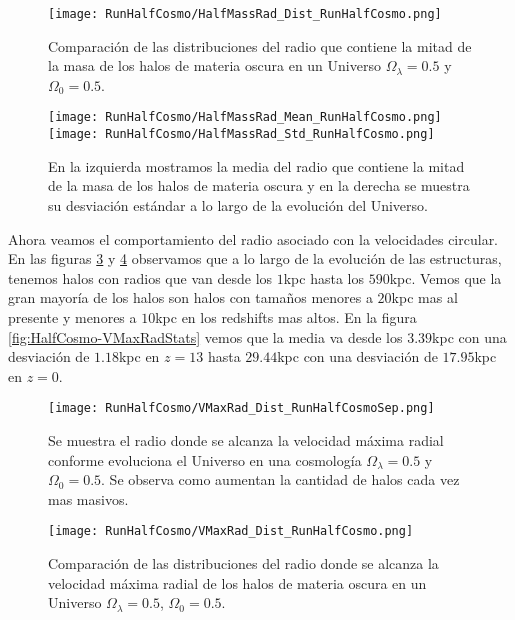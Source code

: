 \begin{figure}[H]
    \centering
    \texttt{[image: RunHalfCosmo/HalfMassRad\_Dist\_RunHalfCosmo.png]}
    \caption[Distribución del Radio que contiene la mitad de la masa]{\footnotesize Comparación de las distribuciones del radio que contiene la mitad de la masa de los halos de materia oscura en un Universo $\Omega_\lambda = 0.5 $ y $\Omega_0 = 0.5$.}
    \label{fig:HalfCosmo-HalfMassRadDist}
\end{figure}

\begin{figure}[H]
    \centering
    \texttt{[image: RunHalfCosmo/HalfMassRad\_Mean\_RunHalfCosmo.png]}
    \texttt{[image: RunHalfCosmo/HalfMassRad\_Std\_RunHalfCosmo.png]}
    \caption[Media y desviación estándar del radio de la mitad de la masa]{\footnotesize En la izquierda mostramos la media del radio que contiene la mitad de la masa de los halos de materia oscura y en la derecha se muestra su desviación estándar a lo largo de la evolución del Universo.}
    \label{fig:HalfCosmo-HalfMassRadStats}
\end{figure}

Ahora veamos el comportamiento del radio asociado con la velocidades circular. En las figuras \ref{fig:HalfCosmo-VMaxRadDistSep} y \ref{fig:HalfCosmo-VMaxRadDist} observamos que a lo largo de la evolución de las estructuras, tenemos halos con radios que van desde los $1$kpc hasta los $590$kpc. Vemos que la gran mayoría de los halos son halos con tamaños menores a $20$kpc mas al presente y menores a $10$kpc en los redshifts mas altos. En la figura \ref{fig:HalfCosmo-VMaxRadStats} vemos que la media va desde los $3.39$kpc con una desviación de $1.18$kpc en $z=13$ hasta $29.44$kpc con una desviación de $17.95$kpc en $z=0$.

\begin{figure}[H]
    \centering
    \texttt{[image: RunHalfCosmo/VMaxRad\_Dist\_RunHalfCosmoSep.png]}
    \caption[Radio donde se alcanza la velocidad máxima radial]{\footnotesize Se muestra el radio donde se alcanza la velocidad máxima radial conforme evoluciona el Universo en una cosmología $\Omega_\lambda = 0.5$ y $\Omega_0 = 0.5$. Se observa como aumentan la cantidad de halos cada vez mas masivos.}
    \label{fig:HalfCosmo-VMaxRadDistSep}
\end{figure}

\begin{figure}[H]
    \centering
    \texttt{[image: RunHalfCosmo/VMaxRad\_Dist\_RunHalfCosmo.png]}
    \caption[Distribución del radio donde se alcanza la velocidad máxima radial]{\footnotesize Comparación de las distribuciones del radio donde se alcanza la velocidad máxima radial de los halos de materia oscura en un Universo $\Omega_\lambda = 0.5$, $\Omega_0 = 0.5$.}
    \label{fig:HalfCosmo-VMaxRadDist}
\end{figure}

